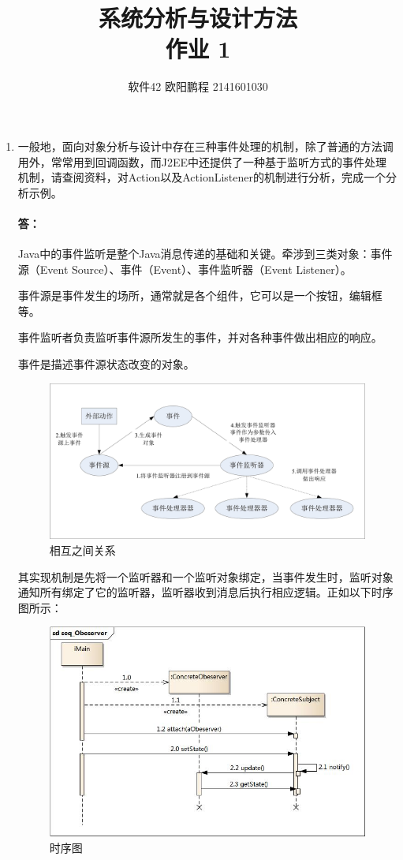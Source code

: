 \documentclass[UTF8]{ctexart}
\title{系统分析与设计方法 \\ 作业 1}
\author{软件42 欧阳鹏程 2141601030}
\begin{document}
\maketitle

\begin{enumerate}
	\item{一般地，面向对象分析与设计中存在三种事件处理的机制，除了普通的方法调用外，常常用到回调函数，而J2EE中还提供了一种基于监听方式的事件处理机制，请查阅资料，对Action以及ActionListener的机制进行分析，完成一个分析示例。}
	
	\paragraph{答：}
	Java中的事件监听是整个Java消息传递的基础和关键。牵涉到三类对象：事件源（Event Source）、事件（Event）、事件监听器（Event Listener）。 
	
	事件源是事件发生的场所，通常就是各个组件，它可以是一个按钮，编辑框等。 
	
	事件监听者负责监听事件源所发生的事件，并对各种事件做出相应的响应。 
	
	事件是描述事件源状态改变的对象。 
	
	\begin{figure}[H]
		\centering
		\includegraphics[width=\textwidth]{1.jpg}
		\caption{相互之间关系}
	\end{figure}

	其实现机制是先将一个监听器和一个监听对象绑定，当事件发生时，监听对象通知所有绑定了它的监听器，监听器收到消息后执行相应逻辑。正如以下时序图所示：
	
	\begin{figure}[H]
		\centering
		\includegraphics[width=\textwidth]{2.jpg}
		\caption{时序图}
	\end{figure}
\end{enumerate}
\end{document}
